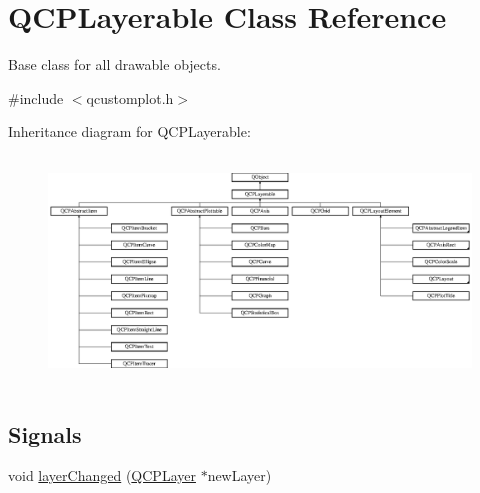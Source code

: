 \hypertarget{class_q_c_p_layerable}{}\section{Q\+C\+P\+Layerable Class Reference}
\label{class_q_c_p_layerable}


Base class for all drawable objects.  




{\ttfamily \#include $<$qcustomplot.\+h$>$}

Inheritance diagram for Q\+C\+P\+Layerable\+:\begin{figure}[H]
\begin{center}
\leavevmode
\includegraphics[height=6.075950cm]{class_q_c_p_layerable}
\end{center}
\end{figure}
\subsection*{Signals}
\begin{DoxyCompactItemize}
\item 
void \hyperlink{class_q_c_p_layerable_abbf8657cedea73ac1c3499b521c90eba}{layer\+Changed} (\hyperlink{class_q_c_p_layer}{Q\+C\+P\+Layer} $\ast$new\+Layer)
\end{DoxyCompactItemize}
